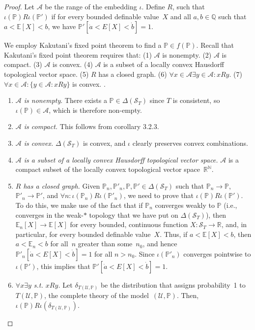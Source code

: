\documentclass[12pt]{article}
\newcommand{\PP}{\mathbb{P}}
\newcommand{\EE}{\mathbb{E}}
\newcommand{\RR}{\mathbb{R}}
\newcommand{\NN}{\mathbb{N}}
\newcommand{\QQ}{\mathbb{Q}}
\newcommand{\cA}{\mathcal{A}}
\newcommand{\cS}{\mathcal{S}}
\newcommand{\cU}{\mathcal{U}}
\theoremstyle{plain}
\theoremstyle{definition}
\theoremstyle{remark}
\begin{document}
\begin{proof}
Let $\cA$ be the range of the embedding $\iota$. Define $R$, such that $\iota(\PP)R\iota(\PP')$ if for every bounded definable value~$X$ and all $a,b\in\QQ$ such that $a<\EE[X]<b$, we have $\PP'[\dot a < E[X] < \dot b] = 1$.

We employ Kakutani's fixed point theorem to find a $\PP \in f(\PP)$. Recall that Kakutani's fixed point theorem requires that:
(1) $\mathcal{A}$ is nonempty.
(2) $\mathcal{A}$ is compact.
(3) $\mathcal{A}$ is convex.
(4) $\mathcal{A}$ is a subset of a locally convex Hausdorff topological vector space.
(5) $R$ has a closed graph.
(6) $\forall x\in\cA \exists y\in\cA : xRy$.
(7) $\forall x\in\cA:\{y \in \mathcal{A}: xRy\}$ is convex.
\cite{kakutani41}.

\begin{enumerate}
\item \emph{$\mathcal{A}$ is nonempty}. There exists a $\PP\in\Delta(\cS_T)$ since $T$ is consistent, so $\iota(\PP)\in\cA$, which is therefore non-empty.

\item \emph{$\mathcal{A}$ is compact.} This follows from corollary 3.2.3.

\item \emph{$\mathcal{A}$ is convex.} $\Delta(\cS_T)$ is convex, and $\iota$ clearly preserves convex combinations.

\item \emph{$\mathcal{A}$ is a subset of a locally convex Hausdorff topological vector space.} $\mathcal{A}$ is a compact subset of the locally convex topological vector space~$\RR^\NN$.

\item \emph{$R$ has a closed graph.} Given $\PP_n,\PP'_n,\PP,\PP'\in\Delta(\cS_T)$ such that $\PP_n\to\PP$, $\PP'_n\to\PP'$, and $\forall n : \iota(\PP_n)R\iota(\PP'_n)$, we need to prove that $\iota(\PP)R\iota(\PP')$. 
To do this, we make use of the fact that if $\PP_n$ converges weakly to $\PP$ (i.e., converges in the weak-$*$ topology that we have put on $\Delta(\cS_T)$), then $\EE_n[X]\to\EE[X]$ for every bounded, continuous function $X : \cS_T\to\RR$, and, in particular, for every bounded definable value~$X$. 
Thus, if $a < \EE[X] < b$, then $a < \EE_n < b$ for all~$n$ greater than some~$n_0$, and hence $\PP'_n[\dot a < E[X] < \dot b] = 1$ for all $n>n_0$.
Since $\iota(\PP'_n)$ converges pointwise to $\iota(\PP')$, this implies that $\PP'[\dot a < E[X] < \dot b] = 1$.

\item \emph{$\forall x \exists y$ s.t. $xRy$.} Let $\delta_{T(\cU,\PP)}$ be the distribution that assigns probability~1 to~$T(\cU,\PP)$, the complete theory of the model~$(\cU,\PP)$. Then, $\iota(\PP)R\iota(\delta_{T(\cU,\PP)})$.


\end{enumerate}
\end{proof}
\end{document}
